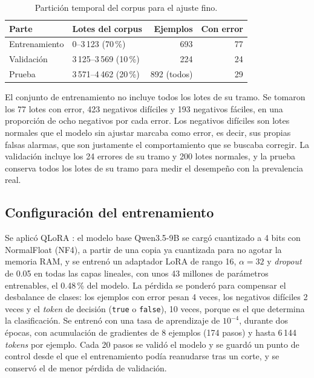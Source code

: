 \begin{table}[H]
\centering
\caption{Partición temporal del corpus para el ajuste fino.}
\label{tab:met_particion}
\small
\begin{tabular}{@{}llrr@{}}
\toprule
\textbf{Parte} & \textbf{Lotes del corpus} & \textbf{Ejemplos} & \textbf{Con error} \\
\midrule
Entrenamiento & 0--3\,123 (70\,\%) & 693 & 77 \\
Validación & 3\,125--3\,569 (10\,\%) & 224 & 24 \\
Prueba & 3\,571--4\,462 (20\,\%) & 892 (todos) & 29 \\
\bottomrule
\end{tabular}
\normalsize
\end{table}

El conjunto de entrenamiento no incluye todos los lotes de su tramo. Se tomaron los 77 lotes con error, 423 negativos difíciles y 193 negativos fáciles, en una proporción de ocho negativos por cada error. Los negativos difíciles son lotes normales que el modelo sin ajustar marcaba como error, es decir, sus propias falsas alarmas, que son justamente el comportamiento que se buscaba corregir. La validación incluye los 24 errores de su tramo y 200 lotes normales, y la prueba conserva todos los lotes de su tramo para medir el desempeño con la prevalencia real.

\subsection{Configuración del entrenamiento}

Se aplicó QLoRA \cite{dettmers2023_qlora}: el modelo base Qwen3.5-9B se cargó cuantizado a 4 bits con NormalFloat (NF4), a partir de una copia ya cuantizada para no agotar la memoria RAM, y se entrenó un adaptador LoRA de rango 16, $\alpha = 32$ y \textit{dropout} de 0.05 en todas las capas lineales, con unos 43 millones de parámetros entrenables, el 0.48\,\% del modelo. La pérdida se ponderó para compensar el desbalance de clases: los ejemplos con error pesan 4 veces, los negativos difíciles 2 veces y el \textit{token} de decisión (\texttt{true} o \texttt{false}), 10 veces, porque es el que determina la clasificación. Se entrenó con una tasa de aprendizaje de $10^{-4}$, durante dos épocas, con acumulación de gradientes de 8 ejemplos (174 pasos) y hasta 6\,144 \textit{tokens} por ejemplo. Cada 20 pasos se validó el modelo y se guardó un punto de control desde el que el entrenamiento podía reanudarse tras un corte, y se conservó el de menor pérdida de validación.

